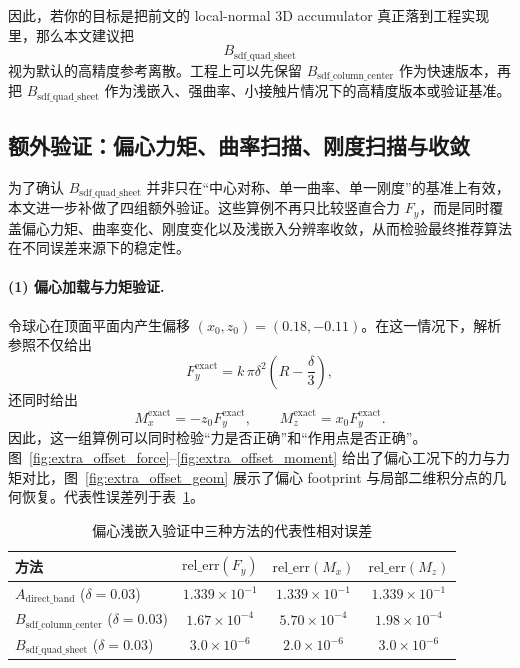 \documentclass[12pt,a4paper]{ctexart}
\begin{document}
因此，若你的目标是把前文的 local-normal 3D accumulator 真正落到工程实现里，那么本文建议把
\begin{equation}
    B_{\mathrm{sdf\_quad\_sheet}}
\end{equation}
视为默认的高精度参考离散。工程上可以先保留 $B_{\mathrm{sdf\_column\_center}}$ 作为快速版本，再把 $B_{\mathrm{sdf\_quad\_sheet}}$ 作为浅嵌入、强曲率、小接触片情况下的高精度版本或验证基准。




\subsection{额外验证：偏心力矩、曲率扫描、刚度扫描与收敛}

为了确认 $B_{\mathrm{sdf\_quad\_sheet}}$ 并非只在“中心对称、单一曲率、单一刚度”的基准上有效，本文进一步补做了四组额外验证。这些算例不再只比较竖直合力 $F_y$，而是同时覆盖偏心力矩、曲率变化、刚度变化以及浅嵌入分辨率收敛，从而检验最终推荐算法在不同误差来源下的稳定性。

\paragraph{(1) 偏心加载与力矩验证.}
令球心在顶面平面内产生偏移 $(x_0,z_0)=(0.18,-0.11)$。在这一情况下，解析参照不仅给出
\begin{equation}
    F_y^{\mathrm{exact}} = k\,\pi\delta^2\left(R-\frac{\delta}{3}\right),
\end{equation}
还同时给出
\begin{equation}
    M_x^{\mathrm{exact}} = -z_0 F_y^{\mathrm{exact}},
    \qquad
    M_z^{\mathrm{exact}} = x_0 F_y^{\mathrm{exact}}.
\end{equation}
因此，这一组算例可以同时检验“力是否正确”和“作用点是否正确”。图~\ref{fig:extra_offset_force}--\ref{fig:extra_offset_moment} 给出了偏心工况下的力与力矩对比，图~\ref{fig:extra_offset_geom} 展示了偏心 footprint 与局部二维积分点的几何恢复。代表性误差列于表~\ref{tab:extra_offset}。

\begin{table}[H]
\centering
\caption{偏心浅嵌入验证中三种方法的代表性相对误差}
\label{tab:extra_offset}
\begin{tabular}{@{}>{\raggedright\arraybackslash}p{4.5cm}ccc@{}}
\toprule
方法 & $\mathrm{rel\_err}(F_y)$ & $\mathrm{rel\_err}(M_x)$ & $\mathrm{rel\_err}(M_z)$ \\
\midrule
$A_{\mathrm{direct\_band}}$ ($\delta=0.03$) & $1.339\times 10^{-1}$ & $1.339\times 10^{-1}$ & $1.339\times 10^{-1}$ \\
$B_{\mathrm{sdf\_column\_center}}$ ($\delta=0.03$) & $1.67\times 10^{-4}$ & $5.70\times 10^{-4}$ & $1.98\times 10^{-4}$ \\
$B_{\mathrm{sdf\_quad\_sheet}}$ ($\delta=0.03$) & $3.0\times 10^{-6}$ & $2.0\times 10^{-6}$ & $3.0\times 10^{-6}$ \\
\bottomrule
\end{tabular}
\end{table}
\end{document}
